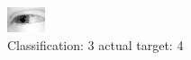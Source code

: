 \begin{figure}[h!]
\begin{center}
\includegraphics[width=0.60\columnwidth]{figures/ID2475_class_3_target_4.png}
\end{center}
\caption{ Classification: 3 actual target: 4}
\label{fig:ID2475_class_3_target_4}
\end{figure}
